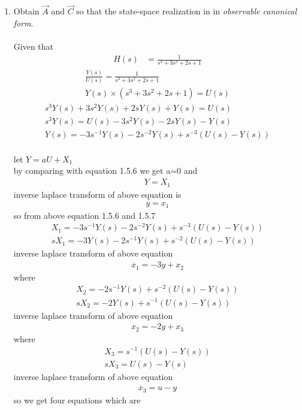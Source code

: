 \begin{enumerate}[label=\thesection.\arabic*.,ref=\thesection.\theenumi]
\item Obtain $\vec{A}$ and $\vec{C}$ so that the state-space realization in in {\em observable canonical form}.
\\
\solution
\\ Given that
\begin{align}
H(s)&=\frac{1}{s^3+3s^2+2s+1}
\end{align}
\begin{align}
\frac{Y(s)}{U(s)}=\frac{1}{s^3+3s^2+2s+1} \\
Y(s) \times (s^3+3s^2+2s+1) = U(s)
\end{align}
\begin{align}
s^3Y(s)+3s^2Y(s)+2sY(s)+Y(s)=U(s)\\
s^3Y(s)=U(s)-3s^2Y(s)-2sY(s)-Y(s)\\
Y(s)=-3s^{-1}Y(s)-2s^{-2}Y(s)+s^{-3}(U(s)-Y(s))
\end{align}
\\ let $Y=aU+X_{1}$
\\ by comparing with equation 1.5.6 we get a=0 and
\begin{align}
Y=X_{1}
\end{align}
inverse laplace transform of above equation is 
\begin{align}
y=x_{1}
\end{align}
so from above equation 1.5.6 and 1.5.7
\begin{align}
X_{1}=-3s^{-1}Y(s)-2s^{-2}Y(s)+s^{-3}(U(s)-Y(s))\\
sX_{1}=-3Y(s)-2s^{-1}Y(s)+s^{-2}(U(s)-Y(s)) 
\end{align}
inverse laplace transform of above equation 
\begin{align}
\dot{x_{1}}=-3y+x_{2}
\end{align} 
where
\begin{align}
X_{2}=-2s^{-1}Y(s)+s^{-2}(U(s)-Y(s))\\
sX_{2}=-2Y(s)+s^{-1}(U(s)-Y(s))
\end{align} 
inverse laplace transform of above equation 
\begin{align}
\dot{x_{2}}=-2y+x_{3}
\end{align}
where
\begin{align}
X_{3}=s^{-1}(U(s)-Y(s))\\
sX_{3}=U(s)-Y(s)
\end{align} 
inverse laplace transform of above equation 
\begin{align}
\dot{x_{3}}=u-y
\end{align}
so we get four equations which are

\end{enumerate}
